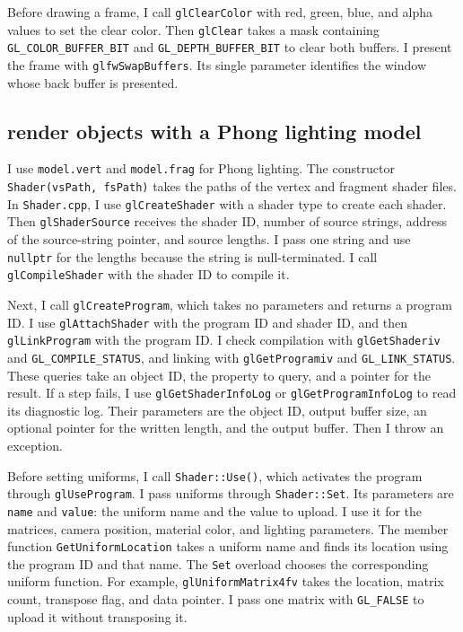 \documentclass[acmtog]{acmart}
\begin{document}
Before drawing a frame, I call \texttt{glClearColor} with red, green, blue, and alpha values to set the clear color. Then \texttt{glClear} takes a mask containing \texttt{GL\_COLOR\_BUFFER\_BIT} and \texttt{GL\_DEPTH\_BUFFER\_BIT} to clear both buffers. I present the frame with \texttt{glfwSwapBuffers}. Its single parameter identifies the window whose back buffer is presented.
\subsection{render objects with a Phong lighting model}
I use \texttt{model.vert} and \texttt{model.frag} for Phong lighting. The constructor \texttt{Shader(vsPath, fsPath)} takes the paths of the vertex and fragment shader files. In \texttt{Shader.cpp}, I use \texttt{glCreateShader} with a shader type to create each shader. Then \texttt{glShaderSource} receives the shader ID, number of source strings, address of the source-string pointer, and source lengths. I pass one string and use \texttt{nullptr} for the lengths because the string is null-terminated. I call \texttt{glCompileShader} with the shader ID to compile it.

Next, I call \texttt{glCreateProgram}, which takes no parameters and returns a program ID. I use \texttt{glAttachShader} with the program ID and shader ID, and then \texttt{glLinkProgram} with the program ID. I check compilation with \texttt{glGetShaderiv} and \texttt{GL\_COMPILE\_STATUS}, and linking with \texttt{glGetProgramiv} and \texttt{GL\_LINK\_STATUS}. These queries take an object ID, the property to query, and a pointer for the result. If a step fails, I use \texttt{glGetShaderInfoLog} or \texttt{glGetProgramInfoLog} to read its diagnostic log. Their parameters are the object ID, output buffer size, an optional pointer for the written length, and the output buffer. Then I throw an exception.

Before setting uniforms, I call \texttt{Shader::Use()}, which activates the program through \texttt{glUseProgram}. I pass uniforms through \texttt{Shader::Set}. Its parameters are \texttt{name} and \texttt{value}: the uniform name and the value to upload. I use it for the matrices, camera position, material color, and lighting parameters. The member function \texttt{GetUniformLocation} takes a uniform name and finds its location using the program ID and that name. The \texttt{Set} overload chooses the corresponding uniform function. For example, \texttt{glUniformMatrix4fv} takes the location, matrix count, transpose flag, and data pointer. I pass one matrix with \texttt{GL\_FALSE} to upload it without transposing it.
\end{document}
